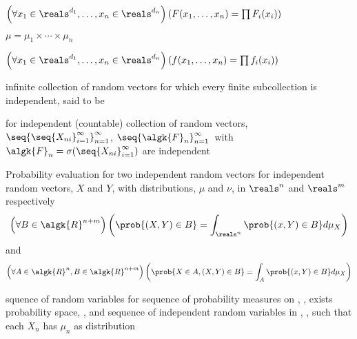 \documentclass[17pt,landscape]{foils}
\newcommand{\algR}{\algk{R}}
\begin{document}
{	\vitem
		$
			\left( \forall x_1\in \reals^{d_1},\ldots,x_n\in\reals^{d_n} \right)
			\left( F(x_1,\ldots,x_n) = \prod F_i(x_i) \right)
		$

	\vitem
		$\mu = \mu_1 \times \cdots \times \mu_n $

	\vitem
		$
			\left( \forall x_1\in \reals^{d_1},\ldots,x_n\in\reals^{d_n} \right)
			\left( f(x_1,\ldots,x_n) = \prod f_i(x_i) \right)
		$
	\eit
\eit



\bit
\item
	infinite collection of random vectors
	for which every finite subcollection is independent,
	said to be 

\vitem
	for independent (countable) collection of random vectors, $\seq{\seq{X_{ni}}_{i=1}^\infty}_{n=1}^\infty$,
	$\seq{\algk{F}_n}_{n=1}^\infty$\ with $\algk{F}_n = \sigma(\seq{X_{ni}}_{i=1}^\infty)$
	are independent
\eit



\begin{mytheorem}{Probability evaluation for two independent random vectors}
	for independent random vectors, $X$ and $Y$,
	with distributions, $\mu$ and $\nu$, in $\reals^n$ and $\reals^m$ respectively
	$$
		\left(
			\forall B\in\algR^{n+m}
		\right)
		\left(
				\prob{(X,Y)\in B} = \int_{\reals^n} \prob{(x,Y)\in B} d\mu_X
		\right)
	$$
	and
	$$
		\left(
			\forall A\in\algR^{n}, B\in\algR^{n+m}
		\right)
		\left(
				\prob{X\in A, (X,Y)\in B} = \int_{A} \prob{(x,Y)\in B} d\mu_X
		\right)
	$$
\end{mytheorem}



\begin{mytheorem}{squence of random variables}
	for sequence of probability measures on \algR, ,
	exists probability space, ,
	and sequence of independent random variables in \reals, ,
	such that each $X_n$ has $\mu_n$ as distribution
\end{mytheorem}



}
\end{document}
